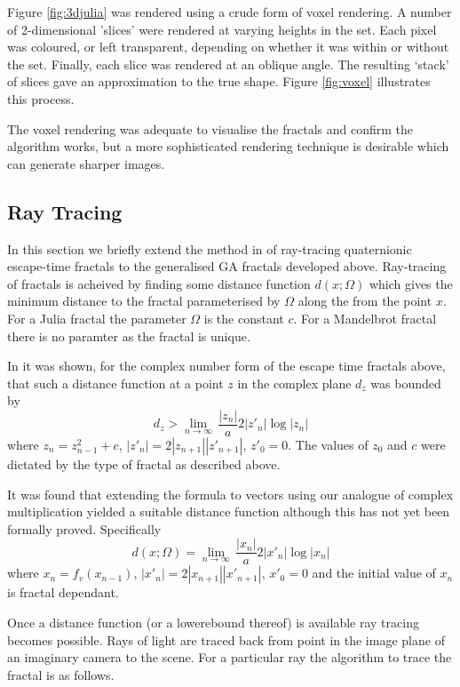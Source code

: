 Figure \ref{fig:3djulia} was rendered using a crude form of voxel rendering. A
number of 2-dimensional 'slices' were rendered at varying heights in the set. Each
pixel was coloured, or left transparent, depending on whether it was within or without
the set. Finally, each slice was rendered at an oblique angle. The resulting
`stack' of slices gave an approximation to the true shape. Figure
\ref{fig:voxel} illustrates this process.

The voxel rendering was adequate to visualise the fractals and confirm the algorithm
works, but a more sophisticated rendering technique is desirable which can generate
sharper images.

\subsection{Ray Tracing}

In this section we briefly extend the method in \cite{FRAC:HypercomplexIterations} of 
ray-tracing quaternionic escape-time fractals to the generalised GA fractals developed 
above. Ray-tracing of fractals is acheived by finding some distance function
$d(x;\Omega)$ which gives the minimum distance to the fractal parameterised by
$\Omega$ along the from the point $x$. For a Julia fractal the
parameter $\Omega$ is the constant $c$. For a Mandelbrot fractal there is no
paramter as the fractal is unique. 

In \cite{FRAC:HypercomplexIterations} it was shown, for the complex number
form of the escape time fractals above, that such a distance function
at a point $z$ in the complex plane $d_z$ was bounded by
\[
d_z > \lim_{n \rightarrow \infty}\,\frac{|z_n|}a{2|z'_n|}\log|z_n|
\]
where $z_n = z_{n-1}^2 + c$, $|z'_n| = 2|z_{n+1}||z'_{n+1}|$, $z'_0 = 0$.
The values of $z_0$ and $c$ were dictated by the type of fractal as described above.

It was found that extending the formula to vectors using our analogue of
complex multiplication yielded a suitable distance function although this has not
yet been formally proved. Specifically
\[
d(x; \Omega) = \lim_{n \rightarrow \infty}\,\frac{|x_n|}a{2|x'_n|}\log|x_n|
\]
where $x_n = f_v(x_{n-1})$, $|x'_n| = 2|x_{n+1}||x'_{n+1}|$, $x'_0 = 0$ and
the initial value of $x_n$ is fractal dependant. 

Once a distance function (or a lowerebound thereof) is available ray tracing
becomes possible. Rays of light are traced back from point in the image
plane of an imaginary camera to the scene. For a particular ray the algorithm
to trace the fractal is as follows.

